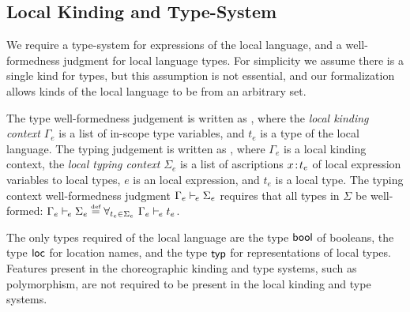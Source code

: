 \subsection{Local Kinding and Type-System}
\label{sec:local-types}
We require a type-system for expressions of the local language, and a well-formedness judgment for local language types.
For simplicity we assume there is a single kind for types, but this assumption is not essential, and our formalization allows kinds of the local language to be from an arbitrary set.

The type well-formedness judgement is written as , where the \emph{local kinding context} $\Gamma_e$ is a list of in-scope type variables, and $t_e$ is a type of the local language.
The typing judgement is written as , where $\Gamma_e$ is a local kinding context, the \emph{local typing context} $\Sigma_e$ is a list of ascriptions $x \mkern2mu{:}\mkern2mu t_e$ of local expression variables to local types, $e$ is an local expression, and $t_e$ is a local type.
The typing context well-formedness judgment $\Gamma_e \vdash_{\mkern-2mu e} \Sigma_e$ requires that all types in $\Sigma$ be well-formed: $\Gamma_e \vdash_{\mkern-2mu e} \Sigma_e \stackrel{\text{\normalfont\tiny def}}{=} \forall_{t_e \in \Sigma_e}~\Gamma_e \vdash_{\mkern-2mu e} t_e$.

The only types required of the local language are the type $\mathsf{bool}$ of booleans, the type $\mathsf{loc}$ for location names, and the type $\mathsf{typ}$ for representations of local types.
Features present in the choreographic kinding and type systems, such as polymorphism, are not required to be present in the local kinding and type systems.


